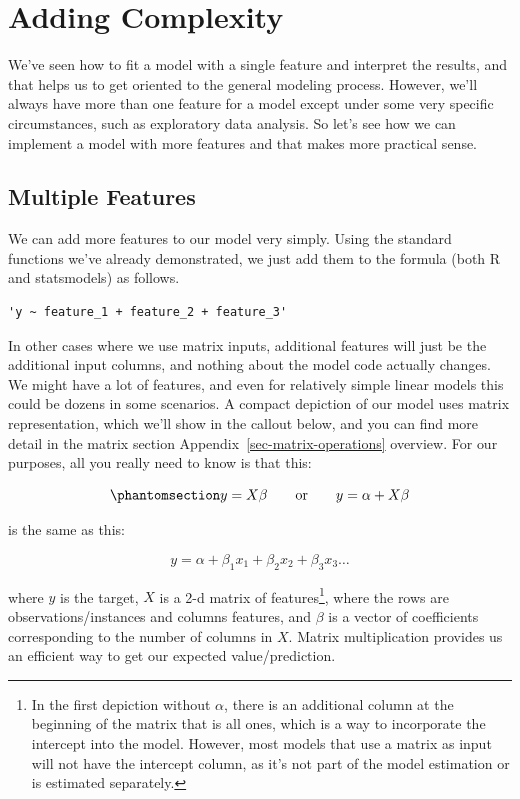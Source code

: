 \documentclass[
  letterpaper,
]{krantz}
\begin{document}
\section{Adding Complexity}\label{sec-lm-complexity}

We've seen how to fit a model with a single feature and interpret the
results, and that helps us to get oriented to the general modeling
process. However, we'll always have more than one feature for a model
except under some very specific circumstances, such as exploratory data
analysis. So let's see how we can implement a model with more features
and that makes more practical sense.

\subsection{Multiple Features}\label{sec-lm-multiple-features}

We can add more features to our model very simply. Using the standard
functions we've already demonstrated, we just add them to the formula
(both R and {statsmodels}) as follows.

\begin{verbatim}
'y ~ feature_1 + feature_2 + feature_3'
\end{verbatim}

In other cases where we use matrix inputs, additional features will just
be the additional input columns, and nothing about the model code
actually changes. We might have a lot of features, and even for
relatively simple linear models this could be dozens in some scenarios.
A compact depiction of our model uses matrix representation, which we'll
show in the callout below, and you can find more detail in the matrix
section Appendix~\ref{sec-matrix-operations} overview. For our purposes,
all you really need to know is that this:

\begin{equation}\phantomsection\label{eq-lm-XB}{
y = X\beta\qquad  \textrm{or}\qquad y = \alpha + X\beta
}\end{equation}

is the same as this:

\[
y = \alpha + \beta_1 x_1 + \beta_2 x_2 + \beta_3 x_3 \dots
\]

where \(y\) is the target, \(X\) is a 2-d matrix of features\footnote{In
  the first depiction without \(\alpha\), there is an additional column
  at the beginning of the matrix that is all ones, which is a way to
  incorporate the intercept into the model. However, most models that
  use a matrix as input will not have the intercept column, as it's not
  part of the model estimation or is estimated separately.}, where the
rows are observations/instances and columns features, and \(\beta\) is a
vector of coefficients corresponding to the number of columns in \(X\).
Matrix multiplication provides us an efficient way to get our expected
value/prediction.
\end{document}
